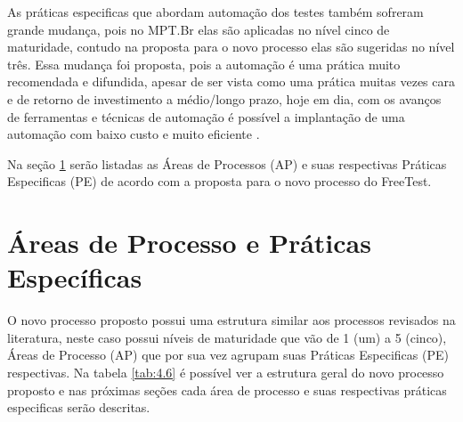 As práticas especificas que abordam automação dos testes também sofreram grande mudança, pois no MPT.Br elas são aplicadas no nível cinco de maturidade, contudo na proposta para o novo processo elas são sugeridas no nível três. Essa mudança foi proposta, pois a automação é uma prática muito recomendada e difundida, apesar de ser vista como uma prática muitas vezes cara e de retorno de investimento a médio/longo prazo, hoje em dia, com os avanços de ferramentas e técnicas de automação é possível a implantação de uma automação com baixo custo e muito eficiente \cite{BRAGA2015}.

Na seção \ref{sec:areasdeprocessoepraticas} serão listadas as Áreas de Processos (AP) e suas respectivas Práticas Especificas (PE) de acordo com a proposta para o novo processo do FreeTest.

\section{Áreas de Processo e Práticas Específicas}
\label{sec:areasdeprocessoepraticas}

O novo processo proposto possui uma estrutura similar aos processos revisados na literatura, neste caso possui níveis de maturidade que vão de 1 (um) a 5 (cinco), Áreas de Processo (AP) que por sua vez agrupam suas Práticas Especificas (PE) respectivas. Na tabela \ref{tab:4.6} é possível ver a estrutura geral do novo processo proposto e nas próximas seções cada área de processo e suas respectivas práticas especificas serão descritas.


